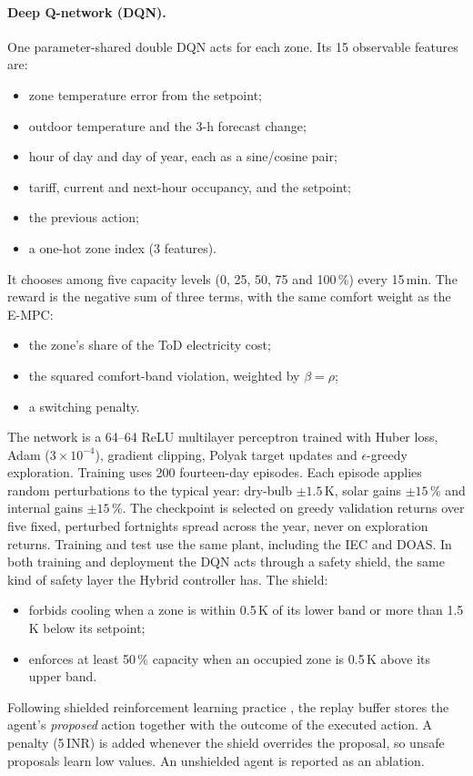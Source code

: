 \paragraph{Deep Q-network (DQN).}
One parameter-shared double DQN \cite{mnih2015,vanhasselt2016} acts for each zone. Its
15 observable features are:
\begin{itemize}
  \item zone temperature error from the setpoint;
  \item outdoor temperature and the 3-h forecast change;
  \item hour of day and day of year, each as a sine/cosine pair;
  \item tariff, current and next-hour occupancy, and the setpoint;
  \item the previous action;
  \item a one-hot zone index (3 features).
\end{itemize}
It chooses among five capacity levels (0, 25, 50, 75 and 100\,\%) every 15\,min. The
reward is the negative sum of three terms, with the same comfort weight as the E-MPC:
\begin{itemize}
  \item the zone's share of the ToD electricity cost;
  \item the squared comfort-band violation, weighted by $\beta=\rho$;
  \item a switching penalty.
\end{itemize}
The network is a 64--64 ReLU multilayer perceptron trained with Huber loss, Adam
($3\times10^{-4}$), gradient clipping, Polyak target updates and $\epsilon$-greedy
exploration. Training uses 200 fourteen-day episodes. Each episode applies random
perturbations to the typical year: dry-bulb $\pm1.5$\,K, solar gains $\pm15$\,\% and
internal gains $\pm15$\,\%. The checkpoint is selected on greedy validation returns
over five fixed, perturbed fortnights spread across the year, never on exploration
returns. Training and test use the same plant, including the IEC and DOAS.
In both training and deployment the DQN acts through a safety shield, the same kind of
safety layer the Hybrid controller has. The shield:
\begin{itemize}
  \item forbids cooling when a zone is within 0.5\,K of its lower band or more than
        1.5\,K below its setpoint;
  \item enforces at least 50\,\% capacity when an occupied zone is 0.5\,K above its
        upper band.
\end{itemize}
Following shielded reinforcement learning practice \cite{alshiekh2018}, the replay
buffer stores the agent's \emph{proposed} action together with the outcome of the
executed action. A penalty (5\,INR) is added whenever the shield overrides the
proposal, so unsafe proposals learn low values. An unshielded agent is reported as an
ablation.

